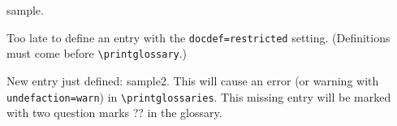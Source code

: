 \documentclass{article}
\begin{document}

\gls{sample}.

\printglossaries

Too late to define an entry with the \texttt{docdef=restricted}
setting. (Definitions must come before \verb|\printglossary|.)


New entry just defined: \gls{sample2}.
This will cause an error (or warning with \texttt{undefaction=warn})
in \verb|\printglossaries|.
This missing entry will be marked with two question marks ?? 
in the glossary.
\end{document}
